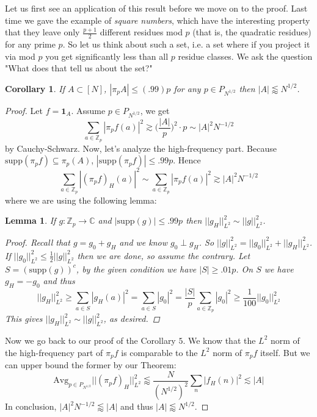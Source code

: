 \documentclass[12pt]{amsart}
\newtheorem{lemma}[theorem]{Lemma}
\newtheorem{Corollary}[theorem]{Corollary}
\newcommand{\CC}{\mathbb{C}}
\newcommand{\ZZ}{\mathbb{Z}}
\begin{document}
Let us first see an application of this result before we move on to the proof. Last time we gave the example of \textit{square numbers}, which have the interesting property that they leave only $\frac{p+1}{2}$ different residues mod $p$ (that is, the quadratic residues) for any prime $p$. So let us think about such a set, i.e. a set where if you project it via mod $p$ you get significantly less than all $p$ residue classes. We ask the question "What does that tell us about the set?" 
\begin{Corollary}
    If $A \subset [N]$, $| \pi_p A | \leq (.99)p$ for any $p \in P_{N^{1/2}}$ then $|A| \lessapprox N^{1/2}$.
\end{Corollary}
\begin{proof}
    Let $f = \mathbf{1}_A$. Assume $p \in P_{N^{1/2}}$, we get
    \begin{equation*}
        \sum_{a \in \mathbb{Z}_p} |\pi_p f(a)|^2 \gtrsim \bigg( \dfrac{|A|}{p} \bigg)^2 \cdot p \sim |A|^2 N^{- 1/2} 
    \end{equation*}
    by Cauchy-Schwarz. Now, let's analyze the high-frequency part. Because $\mathrm{supp} (\pi_p f) \subseteq \pi_p(A) $, $|\mathrm{supp} (\pi_p f) | \leq .99p$. Hence
    \begin{equation*}
        \sum_{a \in \ZZ_p }|(\pi_pf)_H(a)|^2 \sim \sum_{a \in \ZZ_p} |\pi_pf(a)|^2 \gtrsim |A|^2 N^{- 1/2} 
    \end{equation*}
    where we are using the following lemma: 
    \begin{lemma}
        If $g : \ZZ_p \to \CC$ and $|\mathrm{supp}(g)| \leq .99p $ then $|| g_H ||_{L^2}^2 \sim ||g||_{L^2}^2$.
        \begin{proof}
            Recall that $g = g_0 + g_H$ and we know $g_0 \perp g_H$. So $||g||_{L^2}^2 = ||g_0||_{L^2}^2 + ||g_H||_{L^2}^2$. If $||g_0||_{L^2}^2 \leq \frac{1}{2} ||g||_{L^2}^2$ then we are done, so assume the contrary. Let $S = (\mathrm{supp} (g))^{c}$, by the given condition we have $|S| \geq .01p$. On $S$ we have $g_H = - g_0$ and thus 
            \begin{equation*}
                || g_H ||_{L^2}^2 \geq \sum_{a \in S} |g_H(a)|^2 = \sum_{a \in S} |g_0|^2 = \frac{|S|}{p} \sum_{a \in \ZZ_p} |g_0|^2 \geq \frac{1}{100} || g_0 ||_{L^2} ^2 
            \end{equation*}
            This gives $ || g_H ||_{L^2} ^2 \sim || g ||_{L^2} ^2 $, as desired.  
        \end{proof}
    \end{lemma}
    Now we go back to our proof of the Corollary $5$. We know that the $L^2$ norm of the high-frequency part of $\pi_p f$ is comparable to the $L^2$ norm of $\pi_p f$ itself. But we can upper bound the former by our Theorem: 
    \begin{equation*}
        \text{Avg}_{p \in P_{N^{1/2}}} || (\pi_p f)_H ||_{L^2} ^2 \lessapprox \dfrac{N}{(N^{1/2})^2} \sum_n |f_H (n)|^2 \lesssim |A|
    \end{equation*}
    In conclusion, $ |A|^2 N^{-1/2} \lessapprox |A| $ and thus $|A| \lessapprox N^{1/2}$. 
\end{proof} 
\end{document}
